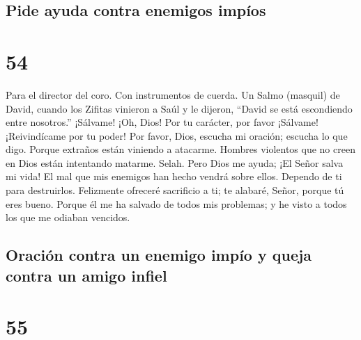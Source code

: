 \hypertarget{pide-ayuda-contra-enemigos-impuxedos}{%
\subsection{Pide ayuda contra enemigos
impíos}\label{pide-ayuda-contra-enemigos-impuxedos}}

\hypertarget{section-53}{%
\section{54}\label{section-53}}

Para el director del coro. Con instrumentos de cuerda. Un Salmo
(masquil) de David, cuando los Zifitas vinieron a Saúl y le dijeron,
``David se está escondiendo entre nosotros.''  ¡Sálvame!
¡Oh, Dios! Por tu carácter, por favor ¡Sálvame! ¡Reivindícame por tu
poder!  Por favor, Dios, escucha mi oración; escucha lo que
digo.  Porque extraños están viniendo a atacarme. Hombres
violentos que no creen en Dios están intentando matarme. Selah.
 Pero Dios me ayuda; ¡El Señor salva mi vida! 
El mal que mis enemigos han hecho vendrá sobre ellos. Dependo de ti para
destruirlos.  Felizmente ofreceré sacrificio a ti; te
alabaré, Señor, porque tú eres bueno.  Porque él me ha
salvado de todos mis problemas; y he visto a todos los que me odiaban
vencidos.

\hypertarget{oraciuxf3n-contra-un-enemigo-impuxedo-y-queja-contra-un-amigo-infiel}{%
\subsection{Oración contra un enemigo impío y queja contra un amigo
infiel}\label{oraciuxf3n-contra-un-enemigo-impuxedo-y-queja-contra-un-amigo-infiel}}

\hypertarget{section-54}{%
\section{55}\label{section-54}}

